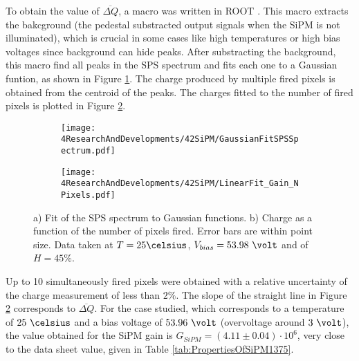 To obtain the value of $\overline{\Delta Q}$, a macro was written in ROOT \cite{ROOTWebPage}. This macro extracts the bakcground (the pedestal substracted output signals when the SiPM is not illuminated), which is crucial in some cases like high temperatures or high bias voltages since background can hide peaks. After substracting the background, this macro find all peaks in the SPS spectrum and fits each one to a Gaussian funtion, as shown in Figure \ref{subfig:GaussianFitSiPMs}. The charge produced by multiple fired pixels is obtained from the centroid of the peaks. The charges fitted to the number of fired pixels is plotted in Figure \ref{subfig:LinearFitSiPMGain}.
\begin{figure}
\centering
    \begin{subfigure}[b]{0.9\textwidth}
    \centering
    \texttt{[image: 4ResearchAndDevelopments/42SiPM/GaussianFitSPSSpectrum.pdf]}  
    \caption{\label{subfig:GaussianFitSiPMs}}
    \end{subfigure}
    \hfill
    \begin{subfigure}[b]{0.9\textwidth}
    \centering
    \texttt{[image: 4ResearchAndDevelopments/42SiPM/LinearFit\_Gain\_NPixels.pdf]}  
    \caption{\label{subfig:LinearFitSiPMGain}}
    \end{subfigure}
 \caption{a) Fit of the SPS spectrum to Gaussian functions. b) Charge as a function of the number of pixels fired. Error bars are within point size. Data taken at $T=25\celsius$, $V_{bias}=53.98~\volt$ and of $H=45\%$.}
 \label{fig:ROOTAnalysisSiPMGain}
\end{figure}
Up to 10 simultaneously fired pixels were obtained with a relative uncertainty of the charge measurement of less than $2\%$. The slope of the straight line in Figure \ref{subfig:LinearFitSiPMGain} corresponds to $\overline{\Delta Q}$.
For the case studied, which corresponds to a temperature of $25~\celsius$ and a bias voltage of $53.96~\volt$ (overvoltage around $3~\volt$), the value obtained for the SiPM gain is $G_{SiPM}=(4.11 \pm 0.04) \cdot{} 10^{6}$, very close to the data sheet value, given in Table \ref{tab:PropertiesOfSiPM1375}.

